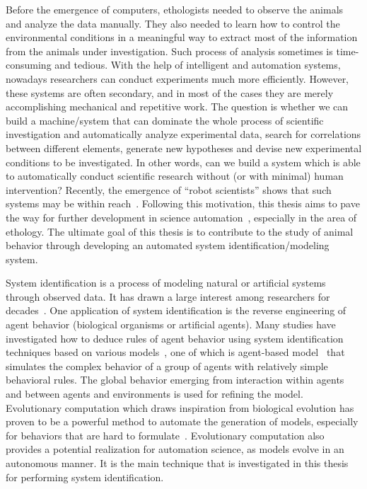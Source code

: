 Before the emergence of computers, ethologists needed to observe the animals and analyze the data manually. They also needed to learn how to control the environmental conditions in a meaningful way to extract most of the information from the animals under investigation. Such process of analysis sometimes is time-consuming and tedious. With the help of intelligent and automation systems, nowadays researchers can conduct experiments much more efficiently. However, these systems are often secondary, and in most of the cases they are merely accomplishing mechanical and repetitive work. The question is whether we can build a machine/system that can dominate the whole process of scientific investigation and automatically analyze experimental data, search for correlations between different elements, generate new hypotheses and devise new experimental conditions to be investigated. In other words, can we build a system which is able to automatically conduct scientific research without (or with minimal) human intervention? Recently, the emergence of ``robot scientists'' shows that such systems may be within reach~\cite{King_2009, Evans_2010, Waltz2010}. Following this motivation, this thesis aims to pave the way for further development in science automation~\cite{Evans_2010}, especially in the area of ethology. The ultimate goal of this thesis is to contribute to the study of animal behavior through developing an automated system identification/modeling system.

System identification is a process of modeling natural or artificial systems through observed data. It has drawn a large interest among researchers for decades~\cite{Ljung2010, Billings2013}. One application of system identification is the reverse engineering of agent behavior (biological organisms or artificial agents). Many studies have investigated how to deduce rules of agent behavior using system identification techniques based on various models~\cite{Shandelle2010}, one of which is agent-based model~\cite{Bonabeau2002} that simulates the complex behavior of a group of agents with relatively simple behavioral rules. The global behavior emerging from interaction within agents and between agents and environments is used for refining the model. Evolutionary computation which draws inspiration from biological evolution has proven to be a powerful method to automate the generation of models, especially for behaviors that are hard to formulate~\cite{Bongard2005_tevc, Bongard2007PNAS, Ruxton2008}. Evolutionary computation also provides a potential realization for automation science, as models evolve in an autonomous manner. It is the main technique that is investigated in this thesis for performing system identification.


